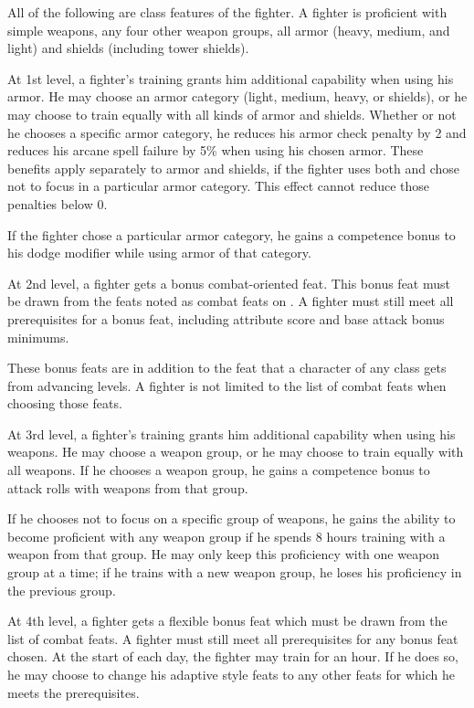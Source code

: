 All of the following are class features of the fighter.
   A fighter is proficient with simple weapons,  any four other weapon groups,  all armor (heavy, medium, and light) and shields (including tower shields).

 At 1st level, a fighter's training grants him additional capability when using his armor. He may choose an armor category (light, medium, heavy, or shields), or he may choose to train equally with all kinds of armor and shields. Whether or not he chooses a specific armor category, he reduces his armor check penalty by 2 and reduces his arcane spell failure by 5\% when using his chosen armor. These benefits apply separately to armor and shields, if the fighter uses both and chose not to focus in a particular armor category. This effect cannot reduce those penalties below 0.
\par If the fighter chose a particular armor category, he gains a  competence bonus to his dodge modifier while using armor of that category.

 At 2nd level, a fighter gets a bonus combat-oriented feat. This bonus feat must be drawn from the feats noted as combat feats on . A fighter must still meet all prerequisites for a bonus feat, including attribute score and base attack bonus minimums.

These bonus feats are in addition to the feat that a character of any class gets from advancing levels. A fighter is not limited to the list of combat feats when choosing those feats.

 At 3rd level, a fighter's training grants him additional capability when using his weapons. He may choose a weapon group, or he may choose to train equally with all weapons. If he chooses a weapon group, he gains a  competence bonus to attack rolls with weapons from that group.
\par If he chooses not to focus on a specific group of weapons, he gains the ability to become proficient with any weapon group if he spends 8 hours training with a weapon from that group. He may only keep this proficiency with one weapon group at a time; if he trains with a new weapon group, he loses his proficiency in the previous group.

 At 4th level, a fighter gets a flexible bonus feat
which must be drawn from the list of combat feats. A fighter must still
meet all prerequisites for any bonus feat chosen. At the start of each day, the fighter may train for an hour. If he does so, he may choose to change his adaptive style feats to any other feats for which he meets the prerequisites.

